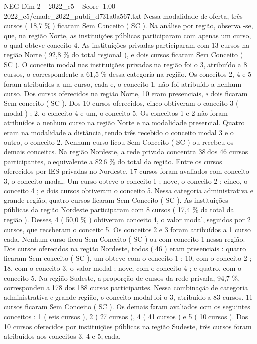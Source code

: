 \begin{textsample}{NEG Dim 2 – 2022\_c5 – Score -1.00 – 2022\_c5/enade\_2022\_publi\_d731a0a567.txt}
Nessa modalidade de oferta, três cursos ( 18,7 \% ) ficaram Sem Conceito ( SC ).
Na análise por região, observa -se, que, na região Norte, as instituições públicas participaram com apenas um curso, o qual obteve conceito 4.
As instituições privadas participaram com 13 cursos na região Norte ( 92,8 \% do total regional ), e dois cursos ficaram Sem Conceito ( SC ).
O conceito modal nas instituições privadas na região foi o 3, atribuído a 8 cursos, o correspondente a 61,5 \% dessa categoria na região.
Os conceitos 2, 4 e 5 foram atribuídos a um curso, cada e, o conceito 1, não foi atribuído a nenhum curso.
Dos cursos oferecidos na região Norte, 10 eram presenciais, e dois ficaram Sem conceito ( SC ).
Dos 10 cursos oferecidos, cinco obtiveram o conceito 3 ( modal ) ; 2, o conceito 4 e um, o conceito 5.
Os conceitos 1 e 2 não foram atribuídos a nenhum curso na região Norte e na modalidade presencial.
Quatro eram na modalidade a distância, tendo três recebido o conceito modal 3 e o outro, o conceito 2.
Nenhum curso ficou Sem Conceito ( SC ) ou recebeu os demais conceitos.
Na região Nordeste, a rede privada concentra 38 dos 46 cursos participantes, o equivalente a 82,6 \% do total da região.
Entre os cursos oferecidos por IES privadas no Nordeste, 17 cursos foram avaliados com conceito 3, o conceito modal.
Um curso obteve o conceito 1 ; nove, o conceito 2 ; cinco, o conceito 4 ; e dois cursos obtiveram o conceito 5.
Nessa categoria administrativa e grande região, quatro cursos ficaram Sem Conceito ( SC ).
As instituições públicas da região Nordeste participaram com 8 cursos ( 17,4 \% do total da região ).
Desses, 4 ( 50,0 \% ) obtiveram conceito 4, o valor modal, seguidos por 2 cursos, que receberam o conceito 5.
Os conceitos 2 e 3 foram atribuídos a 1 curso cada.
Nenhum curso ficou Sem Conceito ( SC ) ou com conceito 1 nessa região.
Dos cursos oferecidos na região Nordeste, todos ( 46 ) eram presenciais : quatro ficaram Sem conceito ( SC ), um obteve com o conceito 1 ; 10, com o conceito 2 ; 18, com o conceito 3, o valor modal ; nove, com o conceito 4 ; e quatro, com o conceito 5.
Na região Sudeste, a proporção de cursos da rede privada, 94,7 \%, correspondeu a 178 dos 188 cursos participantes.
Nessa combinação de categoria administrativa e grande região, o conceito modal foi o 3, atribuído a 83 cursos. 11 cursos ficaram Sem Conceito ( SC ).
Os demais foram avaliados com os seguintes conceitos : 1 ( seis cursos ), 2 ( 27 cursos ), 4 ( 41 cursos ) e 5 ( 10 cursos ).
Dos 10 cursos oferecidos por instituições públicas na região Sudeste, três cursos foram atribuídos aos conceitos 3, 4 e 5, cada.

\end{textsample}
